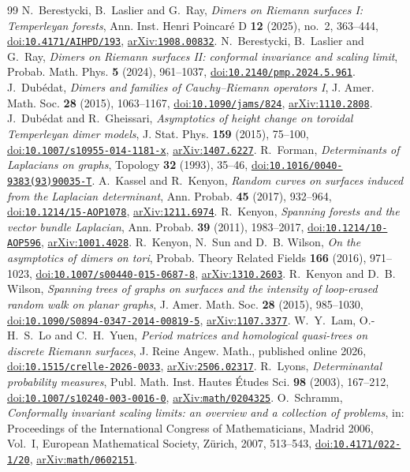 \documentclass[11pt]{amsart}
\theoremstyle{definition}
\theoremstyle{remark}
\newcommand{\doi}[1]{\href{https://doi.org/#1}{doi:\nolinkurl{#1}}}
\newcommand{\arxiv}[1]{\href{https://arxiv.org/abs/#1}{arXiv:\nolinkurl{#1}}}
\begin{document}
\begin{thebibliography}{99}
 N.~Berestycki, B.~Laslier and G.~Ray, \emph{Dimers on Riemann surfaces I: Temperleyan forests}, Ann.
Inst. Henri Poincar\'e D \textbf{12} (2025), no.~2, 363--444, \doi{10.4171/AIHPD/193}, \arxiv{1908.00832}.
 N.~Berestycki, B.~Laslier and G.~Ray, \emph{Dimers on Riemann surfaces II: conformal invariance and
scaling limit}, Probab. Math. Phys. \textbf{5} (2024), 961--1037, \doi{10.2140/pmp.2024.5.961}.
 J.~Dub\'edat, \emph{Dimers and families of Cauchy--Riemann operators I}, J. Amer. Math. Soc.
\textbf{28} (2015), 1063--1167, \doi{10.1090/jams/824}, \arxiv{1110.2808}.
 J.~Dub\'edat and R.~Gheissari, \emph{Asymptotics of height change on toroidal Temperleyan dimer models},
J. Stat. Phys. \textbf{159} (2015), 75--100, \doi{10.1007/s10955-014-1181-x}, \arxiv{1407.6227}.
 R.~Forman, \emph{Determinants of Laplacians on graphs}, Topology \textbf{32} (1993), 35--46,
\doi{10.1016/0040-9383(93)90035-T}.
 A.~Kassel and R.~Kenyon, \emph{Random curves on surfaces induced from the Laplacian determinant}, Ann.
Probab. \textbf{45} (2017), 932--964, \doi{10.1214/15-AOP1078}, \arxiv{1211.6974}.
 R.~Kenyon, \emph{Spanning forests and the vector bundle Laplacian}, Ann. Probab. \textbf{39} (2011),
1983--2017, \doi{10.1214/10-AOP596}, \arxiv{1001.4028}.
 R.~Kenyon, N.~Sun and D.~B. Wilson, \emph{On the asymptotics of dimers on tori}, Probab. Theory
Related Fields \textbf{166} (2016), 971--1023, \doi{10.1007/s00440-015-0687-8}, \arxiv{1310.2603}.
 R.~Kenyon and D.~B. Wilson, \emph{Spanning trees of graphs on surfaces and the intensity of loop-erased
random walk on planar graphs}, J. Amer. Math. Soc. \textbf{28} (2015), 985--1030, \doi{10.1090/S0894-0347-2014-00819-5},
\arxiv{1107.3377}.
 W.~Y.~Lam, O.-H.~S.~Lo and C.~H.~Yuen, \emph{Period matrices and homological quasi-trees on discrete
Riemann surfaces}, J. Reine Angew. Math., published online 2026, \doi{10.1515/crelle-2026-0033}, \arxiv{2506.02317}.
 R.~Lyons, \emph{Determinantal probability measures}, Publ. Math. Inst. Hautes \'Etudes Sci.
\textbf{98} (2003), 167--212, \doi{10.1007/s10240-003-0016-0}, \arxiv{math/0204325}.
 O.~Schramm, \emph{Conformally invariant scaling limits: an overview and a collection of problems},
in: Proceedings of the International Congress of Mathematicians, Madrid 2006, Vol.~I, European Mathematical Society,
Z\"urich, 2007, 513--543, \doi{10.4171/022-1/20}, \arxiv{math/0602151}.

\end{thebibliography}
\end{document}
